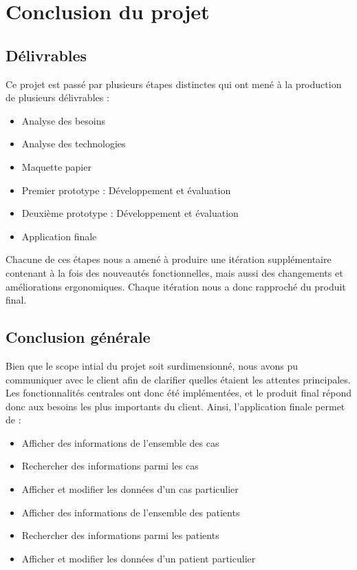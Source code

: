 
\section{Conclusion du projet}

	\subsection{Délivrables}

		Ce projet est passé par plusieurs étapes distinctes qui ont mené à la production de plusieurs délivrables :
		\begin{itemize}
			\item Analyse des besoins
			\item Analyse des technologies
			\item Maquette papier
			\item Premier prototype : Développement et évaluation
			\item Deuxième prototype : Développement et évaluation
			\item Application finale
		\end{itemize}
		Chacune de ces étapes nous a amené à produire une itération supplémentaire contenant à la fois des nouveautés fonctionnelles, mais aussi des changements et améliorations ergonomiques. Chaque itération nous a donc rapproché du produit final.

	\subsection{Conclusion générale}

		Bien que le scope intial du projet soit surdimensionné, nous avons pu communiquer avec le client afin de clarifier quelles étaient les attentes principales. Les fonctionnalités centrales ont donc été implémentées, et le produit final répond donc aux besoins les plus importants du client. Ainsi, l'application finale permet de :
		\begin{itemize}
			\item Afficher des informations de l'ensemble des cas
			\item Rechercher des informations parmi les cas
			\item Afficher et modifier les données d'un cas particulier
			\item Afficher des informations de l'ensemble des patients
			\item Rechercher des informations parmi les patients
			\item Afficher et modifier les données d'un patient particulier
		\end{itemize}
		

